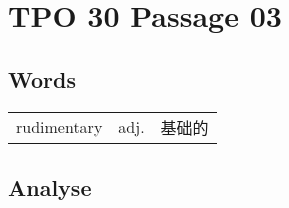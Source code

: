 \section{TPO 30 Passage 03}

\subsection{Words}

\begin{tabular}{lll}
    rudimentary & adj. & 基础的 \\
\end{tabular}

\subsection{Analyse}

